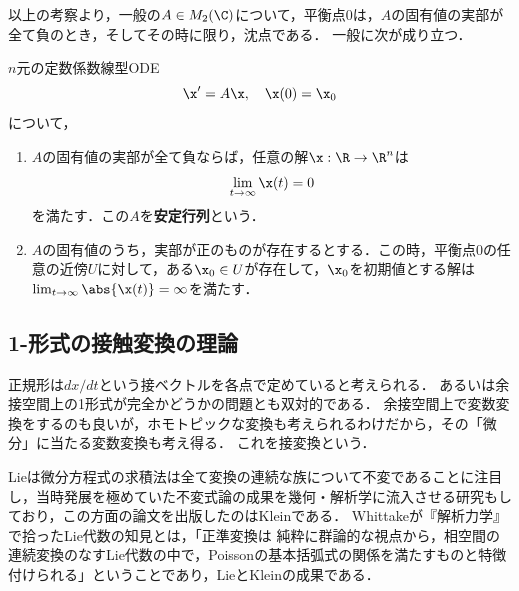 \documentclass[uplatex,dvipdfmx]{jsreport}
\begin{document}
\begin{remarks}
    以上の考察より，一般の$A\in M_2(\C)$について，平衡点$0$は，$A$の固有値の実部が全て負のとき，そしてその時に限り，沈点である．
    一般に次が成り立つ．
\end{remarks}

\begin{theorem}
    $n$元の定数係数線型ODE
    \[\x'=A\x,\quad\x(0)=\x_0\]
    について，
    \begin{enumerate}
        \item $A$の固有値の実部が全て負ならば，任意の解$\x:\R\to\R^n$は
        \[\lim_{t\to\infty}\x(t)=0\]
        を満たす．この$A$を\textbf{安定行列}という．
        \item $A$の固有値のうち，実部が正のものが存在するとする．この時，平衡点$0$の任意の近傍$U$に対して，ある$\x_0\in U$が存在して，$\x_0$を初期値とする解は$\lim_{t\to\infty}\abs{\x(t)}=\infty$を満たす．
    \end{enumerate}
\end{theorem}

\subsection{1-形式の接触変換の理論}

\begin{tcolorbox}[colframe=ForestGreen, colback=ForestGreen!10!white,breakable,colbacktitle=ForestGreen!40!white,coltitle=black,fonttitle=\bfseries\sffamily,
title=]
    正規形は$dx/dt$という接ベクトルを各点で定めていると考えられる．
    あるいは余接空間上の1形式が完全かどうかの問題とも双対的である．
    余接空間上で変数変換をするのも良いが，ホモトピックな変換も考えられるわけだから，その「微分」に当たる変数変換も考え得る．
    これを接変換という．
\end{tcolorbox}

\begin{history}[Lieの視点「微分方程式=1形式を連続変形する」と正準変換=接触変換]
    Lieは微分方程式の求積法は全て変換の連続な族について不変であることに注目し，当時発展を極めていた不変式論の成果を幾何・解析学に流入させる研究もしており，この方面の論文を出版したのはKleinである．
    Whittakeが『解析力学』で拾ったLie代数の知見とは，「正準変換は
    純粋に群論的な視点から，相空間の連続変換のなすLie代数の中で，Poissonの基本括弧式の関係を満たすものと特徴付けられる」ということであり，LieとKleinの成果である．
\end{history}
\end{document}
